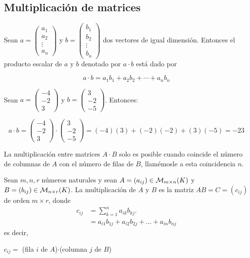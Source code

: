 \subsection{Multiplicación de matrices}


\begin{defin}
Sean $a = \begin{pmatrix} a_1 \\ a_2 \\ \vdots \\ a_n \end{pmatrix}$ y $b = \begin{pmatrix} b_1 \\ b_2 \\ \vdots \\ b_n \end{pmatrix}$ dos vectores de igual dimensión. Entonces el producto escalar de $a$ y $b$ denotado por $a \cdot b$ está dado por 

$$a \cdot b = a_1b_1 + a_2b_2 + \cdots + a_nb_n$$
\end{defin}





\begin{ejem}
Sean $a =  \begin{pmatrix} -4 \\ -2 \\ 3 \end{pmatrix}$ y $b =  \begin{pmatrix} 3 \\ -2 \\ -5 \end{pmatrix}$. Entonces:

$$a \cdot b = \begin{pmatrix} -4 \\ -2 \\ 3 \end{pmatrix} \cdot \begin{pmatrix} 3 \\ -2 \\ -5 \end{pmatrix} = (-4)(3) + (-2)(-2) + (3)(-5) = -23$$
\end{ejem}

La multiplicación entre matrices $A \cdot B$ solo es posible cuando coincide el número de columnas
de $A$ con el número de filas de $B$, llamémosle a esta coincidencia $n$.
\begin{defin}
Sean $m, n, r$ n\'umeros naturales y sean $A=(a_{ij})\in \mathcal{M}_{m\times n}(K)$ y \newline ${B=(b_{ij})\in \mathcal{M}_{n\times r}(K)}$. La multiplicaci\'on de $A$ y $B$ es la matriz $AB=C=(c_{ij})$ de orden $m\times r$, donde 
\begin{align*}
   c_{ij}&=\sum^n_{k=1}a_{ik}b_{kj}.\\
 &= a_{i1}b_{1j} + a_{i2}b_{2j} + \dots +a_{in}b_{nj} 
\end{align*}
es decir,
\begin{center}
    $c_{ij} =$ (fila $i$ de $A$)$\cdot$(columna $j$ de $B$)
\end{center}
\end{defin}

